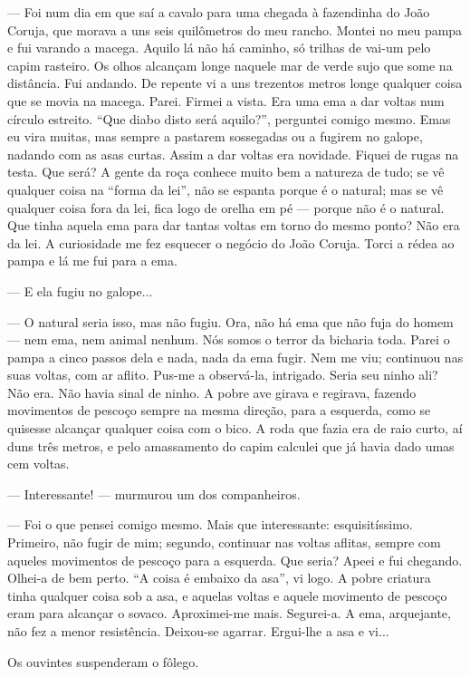 --- Foi num dia em que saí a cavalo para uma chegada à fazendinha do
João Coruja, que morava a uns seis quilômetros do meu rancho. Montei no
meu pampa e fui varando a macega. Aquilo lá não há caminho, só trilhas
de vai-um pelo capim rasteiro. Os olhos alcançam longe naquele mar de
verde sujo que some na distância. Fui andando. De repente vi a uns
trezentos metros longe qualquer coisa que se movia na macega. Parei.
Firmei a vista. Era uma ema a dar voltas num círculo estreito. ``Que
diabo disto será aquilo?'', perguntei comigo mesmo. Emas eu vira muitas,
mas sempre a pastarem sossegadas ou a fugirem no galope, nadando com as
asas curtas. Assim a dar voltas era novidade. Fiquei de rugas na testa.
Que será? A gente da roça conhece muito bem a natureza de tudo; se vê
qualquer coisa na ``forma da lei'', não se espanta porque é o natural;
mas se vê qualquer coisa fora da lei, fica logo de orelha em pé ---
porque não é o natural. Que tinha aquela ema para dar tantas voltas em
torno do mesmo ponto? Não era da lei. A curiosidade me fez esquecer o
negócio do João Coruja. Torci a rédea ao pampa e lá me fui para a ema.

--- E ela fugiu no galope...

--- O natural seria isso, mas não fugiu. Ora, não há ema que não fuja do
homem --- nem ema, nem animal nenhum. Nós somos o terror da bicharia
toda. Parei o pampa a cinco passos dela e nada, nada da ema fugir. Nem
me viu; continuou nas suas voltas, com ar aflito. Pus-me a observá-la,
intrigado. Seria seu ninho ali? Não era. Não havia sinal de ninho. A
pobre ave girava e regirava, fazendo movimentos de pescoço sempre na
mesma direção, para a esquerda, como se quisesse alcançar qualquer coisa
com o bico. A roda que fazia era de raio curto, aí duns três metros, e
pelo amassamento do capim calculei que já havia dado umas cem voltas.

--- Interessante! --- murmurou um dos companheiros.

--- Foi o que pensei comigo mesmo. Mais que interessante:
esquisitíssimo. Primeiro, não fugir de mim; segundo, continuar nas
voltas aflitas, sempre com aqueles movimentos de pescoço para a
esquerda. Que seria? Apeei e fui chegando. Olhei-a de bem perto. ``A
coisa é embaixo da asa'', vi logo. A pobre criatura tinha qualquer coisa
sob a asa, e aquelas voltas e aquele movimento de pescoço eram para
alcançar o sovaco. Aproximei-me mais. Segurei-a. A ema, arquejante, não
fez a menor resistência. Deixou-se agarrar. Ergui-lhe a asa e vi...

Os ouvintes suspenderam o fôlego.

